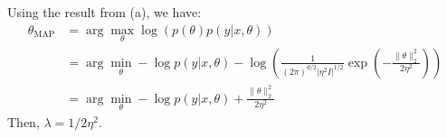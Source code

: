 \begin{answer}
Using the result from (a), we have:
\begin{align}
	\theta_{\text{MAP}} 
	&= \arg\max_{\theta} \log(p(\theta) p(y|x,\theta)) \\
	&= \arg\min_{\theta} -\log p(y|x,\theta) - \log\left( \frac{1}{(2\pi)^{d/2}|\eta^2 I|^{1/2}} \exp(-\frac{\|\theta\|_2^2}{2\eta^2})\right) \\
	&= \arg\min_{\theta} -\log p(y|x,\theta) + \frac{\|\theta\|_2^2}{2\eta^2}
\end{align}
Then, $\lambda = 1/2\eta^2$. \\
\end{answer}

